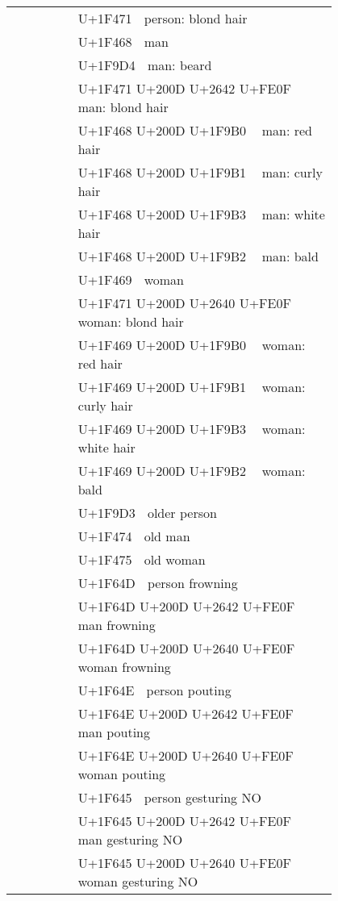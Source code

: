 \documentclass[a4paper,12pt]{ltjarticle}
\newcommand{\fontA}[1]{{\fontspec[RawFeature={mode=harf,+dist,+ccmp}]{Segoe UI Emoji} #1}}
\newcommand{\fontB}[1]{{\fontspec[RawFeature={mode=harf,+dist,+ccmp}]{Noto Color Emoji} #1}}
\begin{document}
\begin{longtable}[c]{ccp{0.8\linewidth}}
\fontA{👱}&\fontB{👱}&U+1F471 👱 person: blond hair\\
\fontA{👨}&\fontB{👨}&U+1F468 👨 man\\
\fontA{🧔}&\fontB{🧔}&U+1F9D4 🧔 man: beard\\
\fontA{👱‍♂️}&\fontB{👱‍♂️}&U+1F471 U+200D U+2642 U+FE0F 👱‍♂️ man: blond hair\\
\fontA{👨‍🦰}&\fontB{👨‍🦰}&U+1F468 U+200D U+1F9B0 👨‍🦰 man: red hair\\
\fontA{👨‍🦱}&\fontB{👨‍🦱}&U+1F468 U+200D U+1F9B1 👨‍🦱 man: curly hair\\
\fontA{👨‍🦳}&\fontB{👨‍🦳}&U+1F468 U+200D U+1F9B3 👨‍🦳 man: white hair\\
\fontA{👨‍🦲}&\fontB{👨‍🦲}&U+1F468 U+200D U+1F9B2 👨‍🦲 man: bald\\
\fontA{👩}&\fontB{👩}&U+1F469 👩 woman\\
\fontA{👱‍♀️}&\fontB{👱‍♀️}&U+1F471 U+200D U+2640 U+FE0F 👱‍♀️ woman: blond hair\\
\fontA{👩‍🦰}&\fontB{👩‍🦰}&U+1F469 U+200D U+1F9B0 👩‍🦰 woman: red hair\\
\fontA{👩‍🦱}&\fontB{👩‍🦱}&U+1F469 U+200D U+1F9B1 👩‍🦱 woman: curly hair\\
\fontA{👩‍🦳}&\fontB{👩‍🦳}&U+1F469 U+200D U+1F9B3 👩‍🦳 woman: white hair\\
\fontA{👩‍🦲}&\fontB{👩‍🦲}&U+1F469 U+200D U+1F9B2 👩‍🦲 woman: bald\\
\fontA{🧓}&\fontB{🧓}&U+1F9D3 🧓 older person\\
\fontA{👴}&\fontB{👴}&U+1F474 👴 old man\\
\fontA{👵}&\fontB{👵}&U+1F475 👵 old woman\\
\fontA{🙍}&\fontB{🙍}&U+1F64D 🙍 person frowning\\
\fontA{🙍‍♂️}&\fontB{🙍‍♂️}&U+1F64D U+200D U+2642 U+FE0F 🙍‍♂️ man frowning\\
\fontA{🙍‍♀️}&\fontB{🙍‍♀️}&U+1F64D U+200D U+2640 U+FE0F 🙍‍♀️ woman frowning\\
\fontA{🙎}&\fontB{🙎}&U+1F64E 🙎 person pouting\\
\fontA{🙎‍♂️}&\fontB{🙎‍♂️}&U+1F64E U+200D U+2642 U+FE0F 🙎‍♂️ man pouting\\
\fontA{🙎‍♀️}&\fontB{🙎‍♀️}&U+1F64E U+200D U+2640 U+FE0F 🙎‍♀️ woman pouting\\
\fontA{🙅}&\fontB{🙅}&U+1F645 🙅 person gesturing NO\\
\fontA{🙅‍♂️}&\fontB{🙅‍♂️}&U+1F645 U+200D U+2642 U+FE0F 🙅‍♂️ man gesturing NO\\
\fontA{🙅‍♀️}&\fontB{🙅‍♀️}&U+1F645 U+200D U+2640 U+FE0F 🙅‍♀️ woman gesturing NO\\

\end{longtable}
\end{document}
